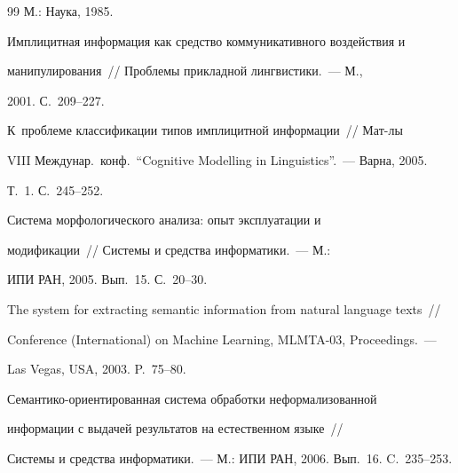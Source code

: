 {{\begin{thebibliography}{99}
М.: Наука, 1985.









Имплицитная информация как средство коммуникативного воздействия и 


манипулирования~/\!\!/ Проблемы прикладной лингвистики.~--- М., 


2001. С.~209--227.









К~проблеме классификации типов имплицитной информации~/\!\!/ Мат-лы 


VIII Междунар.\ конф.\ ``Cognitive Modelling in Linguistics''.~--- Варна, 2005. 


Т.~1. С.~245--252.









Система морфологического анализа: опыт эксплуатации и 


модификации~/\!\!/ Системы и средства информатики.~--- М.: 


ИПИ РАН,  2005.  Вып.~15. С.~20--30.









The system for extracting semantic information from natural language texts~/\!\!/  


 Conference (International) on Machine Learning, MLMTA-03, Proceedings.~---


Las Vegas, USA, 2003. P.~75--80.      









Семантико-ориентированная система обработки неформализованной 


информации с выдачей результатов на естественном языке~/\!\!/ 


Системы и средства информатики.~--- М.: ИПИ РАН, 2006. Вып.~16. C.~235--253.









\end{thebibliography}}}
